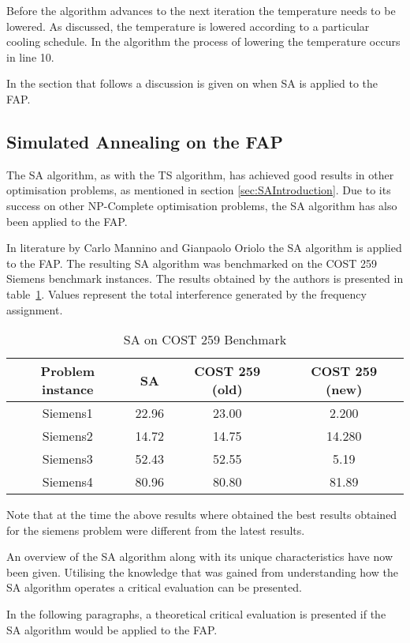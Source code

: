 Before the algorithm advances to the next iteration the temperature needs to be lowered. As discussed, the temperature is lowered according to a particular cooling schedule. In the algorithm the process of lowering the temperature occurs in line 10.

In the section that follows a discussion is given on when SA is applied to the FAP.
\subsection{Simulated Annealing on the FAP}
The SA algorithm, as with the TS algorithm, has achieved good results in other optimisation problems, as mentioned in section \ref{sec:SAIntroduction}. Due to its success on other NP-Complete optimisation problems, the SA algorithm has also been applied to the FAP.

In literature by Carlo Mannino and Gianpaolo Oriolo\cite{SolvingSuperIntervalGraphs} the SA algorithm is applied to the FAP. The resulting SA algorithm was benchmarked on the COST 259 Siemens benchmark instances. The results obtained by the authors is presented in table~\ref{tab:SA}. Values represent the total interference generated by the frequency assignment. 
\begin{table}[H]
\centering
	\begin{tabular}{| c | c | c | c |}
	\hline
	Problem instance & SA & COST 259 (old) & COST 259 (new) \\ \hline
	Siemens1 & 22.96 & 23.00 & 2.200\\ \hline
	Siemens2 & 14.72 & 14.75 & 14.280\\ \hline
	Siemens3 & 52.43 & 52.55 & 5.19\\ \hline
	Siemens4 & 80.96 & 80.80 & 81.89\\ \hline
	\end{tabular}
\caption{SA on COST 259 Benchmark}
\label{tab:SA}
\end{table}
Note that at the time the above results where obtained the best results obtained for the siemens problem were different from the latest results.

An overview of the SA algorithm along with its unique characteristics have now been given. Utilising the knowledge that was gained from understanding how the SA algorithm operates a critical evaluation can be presented. 

In the following paragraphs, a theoretical critical evaluation is presented if the SA algorithm would be applied to the FAP.

